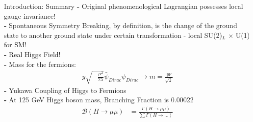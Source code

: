 \documentclass[pdf, 9pt]{beamer}
\begin{document}
  \begin{frame}{Introduction: Summary}
      \textbf{-} Original phenomenological Lagrangian possesses local gauge invariance!\\
      \textbf{-} Spontaneous Symmetry Breaking, \alert{by definition}, is the change of the ground state to another ground state under certain transformation - local SU(2)$_L$ $\times$ U(1) for SM!\\
      \textbf{-} Real Higgs Field!\\
      \textbf{-} Mass for the fermions:\\\vspace{-0.4cm}
      \begin{subequations}
      \begin{align}
        y\sqrt{-\frac{\mu^2}{2\lambda}}\bar{\psi}_{Dirac}\psi_{Dirac} \rightarrow m = \frac{y\nu}{\sqrt{2}}
      \end{align}
      \end{subequations}
      \textbf{-} Yukawa Coupling of Higgs to Fermions\\
      \textbf{-} At 125 GeV Higgs boson mass, Branching Fraction is 0.00022\\
      \begin{subequations}
      \begin{align}
      \mathcal{B}(H \rightarrow \mu\mu)& = \frac{\Gamma(H \rightarrow \mu\mu)}{\sum \Gamma(H \rightarrow \dots)}
      \end{align}
      \end{subequations}
  \end{frame}


{ %
    \begin{frame}[plain]
     \end{frame}
}
\end{document}
